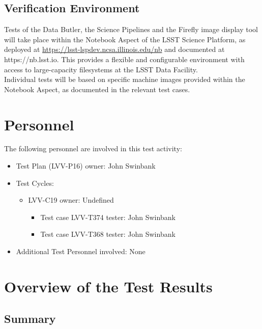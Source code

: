 \documentclass[DM,lsstdraft,STR,toc]{lsstdoc}
\begin{document}
\subsection{Verification Environment}
\label{sect:hwconf}
  Tests of the Data Butler, the Science Pipelines and the Firefly image
display tool will take place within the Notebook Aspect of the LSST
Science Platform, as deployed at
\url{https://lsst-lspdev.ncsa.illinois.edu/nb} and documented at
https://nb.lsst.io. This provides a flexible and configurable
environment with access to large-capacity filesystems at the LSST Data
Facility.\\[2\baselineskip]Individual tests will be based on specific
machine images provided within the Notebook Aspect, as documented in the
relevant test cases.~





\section{Personnel}
\label{sect:personnel}

The following personnel are involved in this test activity:

\begin{itemize}
\item Test Plan (LVV-P16) owner: John Swinbank
\item Test Cycles:
\begin{itemize}
  \item LVV-C19 owner: 
    Undefined
  \begin{itemize}
    \item Test case LVV-T374 tester: John Swinbank
    \item Test case LVV-T368 tester: John Swinbank
  \end{itemize}
\end{itemize}
\item Additional Test Personnel involved: None
\end{itemize}

\newpage

\section{Overview of the Test Results}
\label{sect:overview}

\subsection{Summary}
\label{sect:summarytable}
\end{document}
